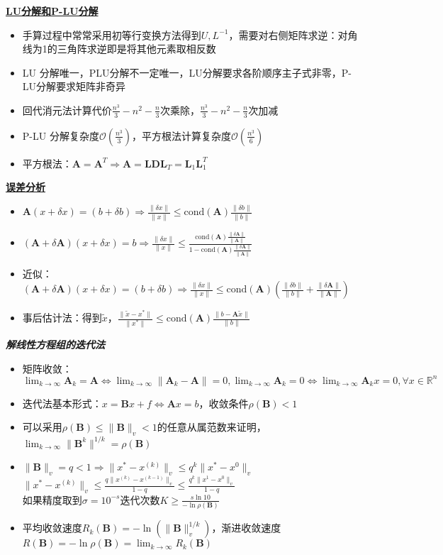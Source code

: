\documentclass[UTF8,a4paper,landscape,8pt]{paper}
\renewcommand{\subsection}[1]{{\small\textbf{\underline{#1}}}\\ }
\renewcommand{\section}[1]{{\normalsize\textbf{\emph{#1}}}\\ }
\newcommand{\List}[1]{\begin{itemize}[fullwidth,itemindent=0em] #1 \end{itemize}}
\begin{document}
\begin{multicols}{4}
    \subsection{LU分解和P-LU分解}
    \List{
        \item {手算过程中常常采用初等行变换方法得到$U,L^{-1}$，需要对右侧矩阵求逆：对角线为1的三角阵求逆即是将其他元素取相反数}
        \item {LU 分解唯一，PLU分解不一定唯一，LU分解要求各阶顺序主子式非零，P-LU分解要求矩阵非奇异}
        \item {回代消元法计算代价$\frac{n^3}{3}-n^2-\frac n3$次乘除，$\frac{n^3}{3}-n^2-\frac n3$次加减}
        \item {P-LU 分解复杂度$\mathcal O(\frac{n^3}3)$，平方根法计算复杂度$\mathcal O(\frac{n^3}6)$}
        \item {平方根法：$\bm A = \bm A^T \Rightarrow \bm A = \bm L\bm D \bm L_T = \bm L_1 \bm L_1^T$}
    }
    \subsection{误差分析}
    \List{
        \item {$\bm A(x+\delta x) = (b+\delta b) \Rightarrow \frac{\|\delta x\|}{\|x\|}\le \mathrm{cond}(\bm A) \frac{\|\delta b\|}{\|b\|}$}
        \item {$(\bm A + \delta\bm A)(x+\delta x) = b \Rightarrow \frac{\|\delta x\|}{\|x\|}\le \frac{\mathrm{cond}(\bm A) \frac{\| \delta \bm A\|}{\|\bm A\|}}{1-\mathrm{cond}(\bm A)\frac{\| \delta \bm A\|}{\|\bm A\|}}$}
        \item {近似：$(\bm A + \delta\bm A)(x+\delta x) = (b+\delta b) \Rightarrow \frac{\|\delta x\|}{\|x\|}\le \mathrm{cond}(\bm A) (\frac{\|\delta b\|}{\|b\|} + \frac{ \|\delta \bm A\|}{\|\bm A\|})$}
        \item {事后估计法：得到$\widetilde x$，$\frac{\|\widetilde x - x^*\|}{\|x^*\|} \le \mathrm{cond}(\bm A)\frac{\|b - \bm A \widetilde x\|}{\|b\|}$}
    }
\section{解线性方程组的迭代法}
    \List{
        \item {矩阵收敛：$\lim_{k\to\infty}\bm A_k = \bm A\iff\lim_{k\to\infty}\|\bm A_k-\bm A\| = 0,\lim_{k\to\infty} \bm A_k =0 \iff \lim_{k\to\infty} \bm A_kx=0, \forall x\in \mathbb R^n$}
        \item {迭代法基本形式：$x = \bm B x + f \iff \bm A x = b$，收敛条件$\rho(\bm B) < 1$}
        \item {可以采用$\rho(\bm B) \le \|\bm B\|_v <1$的任意从属范数来证明，$\lim_{k\to\infty}\|\bm B^k\|^{1/k} = \rho (\bm B)$}
        \item {$\|\bm B\|_v = q < 1 \Rightarrow \|x^*-x^{(k)}\|_v \le q^k \|x^*-x^0\|_v$\\ $\|x^*-x^{(k)}\|_v \le \frac{q\|x^{(k)}-x^{(k-1)}\|_v}{1-q} \le \frac{q^k\|x^{1}-x^{0}\|_v}{1-q} $\\ 如果精度取到$\sigma = 10^{-s}$迭代次数$K \ge \frac{s\ln10}{-\ln\rho (\bm B)}$}
        \item {平均收敛速度$R_k(\bm B) = -\ln(\|\bm B\|_v^{1/k})$，渐进收敛速度$R(\bm B) = -\ln \rho (\bm B) = \lim_{k\to\infty}R_k(\bm B)$}
    }

\end{multicols}
\end{document}
